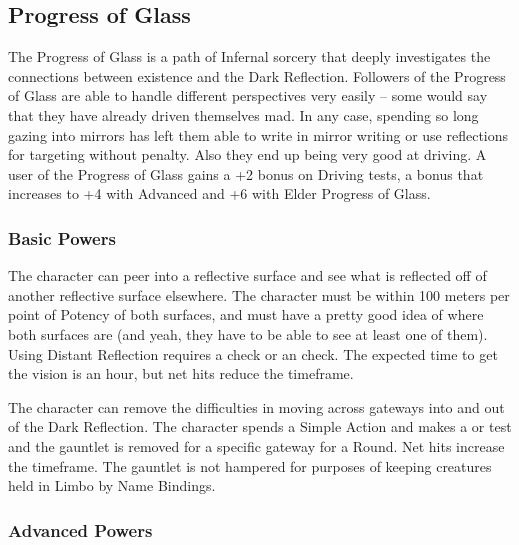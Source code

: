 \subsection{Progress of Glass}

The Progress of Glass is a path of Infernal sorcery that deeply investigates the connections between existence and the Dark Reflection. Followers of the Progress of Glass are able to handle different perspectives very easily -- some would say that they have already driven themselves mad. In any case, spending so long gazing into mirrors has left them able to write in mirror writing or use reflections for targeting without penalty. Also they end up being very good at driving. A user of the Progress of Glass gains a +2 bonus on Driving tests, a bonus that increases to +4 with Advanced and +6 with Elder Progress of Glass.

\subsubsection{Basic Powers}

 The character can peer into a reflective surface and see what is reflected off of another reflective surface elsewhere. The character must be within 100 meters per point of Potency of both surfaces, and must have a pretty good idea of where both surfaces are (and yeah, they have to be able to see at least one of them). Using Distant Reflection requires a  check or an  check. The expected time to get the vision is an hour, but net hits reduce the timeframe.

 The character can remove the difficulties in moving across gateways into and out of the Dark Reflection. The character spends a Simple Action and makes a  or  test and the gauntlet is removed for a specific gateway for a Round. Net hits increase the timeframe. The gauntlet is not hampered for purposes of keeping creatures held in Limbo by Name Bindings.


\subsubsection{Advanced Powers}

